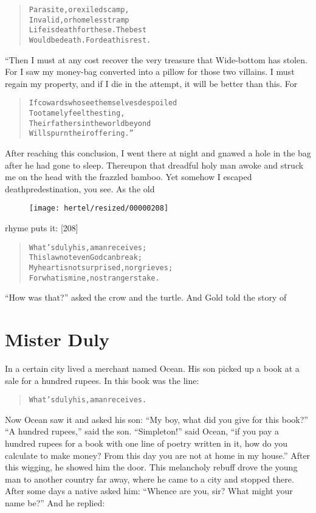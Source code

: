\documentclass[article, twoside, 10pt]{memoir}
\renewenvironment{verbatim}{%
\begin{quote}%
\vskip -10pt%
\begin{alltt}\normalfont\small}{\end{alltt}%
\end{quote}%
\vskip -10pt
} %
\begin{document}
\begin{verbatim}
Parasite, or exiled scamp,
Invalid, or homeless tramp{\textemdash}
Life is death for these. The best
Would be death. For death is rest.
\end{verbatim}
“Then I must at any cost recover the very treasure that Wide-bottom
has stolen. For I saw my money-bag converted into a pillow for
those two villains. I must regain my property, and if I die in the
attempt, it will be better than this. For

\begin{verbatim}
If cowards who see themselves despoiled
    Too tamely feel the sting,
Their fathers in the world beyond
    Will spurn their offering.”
\end{verbatim}
After reaching this conclusion, I went there at night and gnawed a
hole in the bag after he had gone to sleep. Thereupon that dreadful
holy man awoke and struck me on the head with the frazzled bamboo.
Yet somehow I escaped death{\textemdash}predestination, you see. As the old
\begin{figure}[p]\texttt{[image: hertel/resized/00000208]}\end{figure}rhyme puts it: [208]

\begin{verbatim}
What's duly his, a man receives;
    This law not even God can break;
My heart is not surprised, nor grieves;
    For what is mine, no strangers take.
\end{verbatim}
``How was that?'' asked the crow and the turtle. And Gold told the
story of

\chapter{Mister Duly}

In a certain city lived a merchant named Ocean. His son picked up a
book at a sale for a hundred rupees. In this book was the line:

\begin{verbatim}
What's duly his, a man receives.
\end{verbatim}
Now Ocean saw it and asked his son:
``My boy, what did you give for this book?'' ``A hundred rupees,''
said the son. ``Simpleton!'' said Ocean,
``if you pay a hundred rupees for a book with one line of poetry written in it, how do you calculate to make money? From this day you are not at home in my house.''
After this wigging, he showed him the door. This melancholy rebuff
drove the young man to another country far away, where he came to a
city and stopped there. After some days a native asked him:
``Whence are you, sir? What might your name be?'' And he replied:
\end{document}
